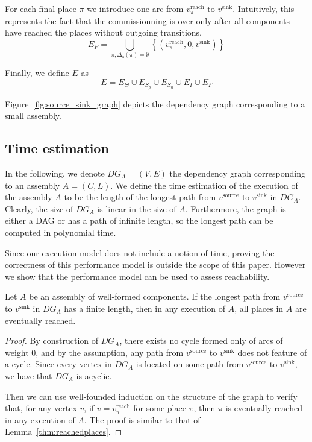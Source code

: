 For each final place $\pi$ we introduce one arc from $v_\pi^\text{reach}$
to $v^\text{sink}$. Intuitively, this represents the fact that the
commissionning is over only after all components have reached the
places without outgoing transitions.
\[
E_F=\bigcup_{\pi, \Delta_o(\pi) = \emptyset}\left\{ \left(v_\pi^\text{reach},0,v^\text{sink}\right)\right\} 
\]

Finally, we define $E$ as 
\[
E= E_{\Theta} \cup E_{S_p}\cup E_{S_u}\cup E_{I}\cup E_{F}
\]

Figure~\ref{fig:source_sink_graph} depicts the dependency graph
corresponding to a small assembly.


\subsection{Time estimation}

In the following, we denote $DG_A=(V,E)$ the dependency graph
corresponding to an assembly $A=(C,L)$. We define the time estimation
of the execution of the \mad assembly $A$ to be the length of the
longest path from $v^\text{source}$ to $v^\text{sink}$ in
$DG_A$. Clearly, the size of $DG_A$ is linear in the size of
$A$. Furthermore, the graph is either a DAG or has a path of infinite
length, so the longest path can be computed in polynomial time.

Since our execution model does not include a notion of time, proving
the correctness of this performance model is outside the scope of this
paper. However we show that the performance model can be used to
assess reachability.

\begin{lemma}
  Let $A$ be an assembly of well-formed components. If the longest
  path from $v^\text{source}$ to $v^\text{sink}$ in $DG_A$ has a
  finite length, then in any execution of $A$, all places in $A$ are
  eventually reached.
\end{lemma}

\begin{proof}
  By construction of $DG_A$, there exists no cycle formed only of arcs
  of weight 0, and by the assumption, any path from $v^\text{source}$
  to $v^\text{sink}$ does not feature of a cycle. Since every vertex
  in $DG_A$ is located on some path from $v^\text{source}$ to
  $v^\text{sink}$, we have that $DG_A$ is acyclic.

  Then we can use well-founded induction on the structure of the graph
  to verify that, for any vertex $v$, if $v = v^\text{reach}_\pi$ for
  some place $\pi$, then $\pi$ is eventually reached in any execution
  of $A$. The proof is similar to that of
  Lemma~\ref{thm:reachedplaces}.
\end{proof}


